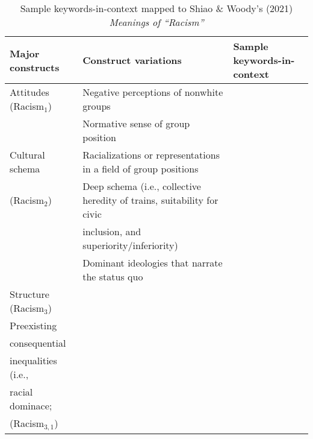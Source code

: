 \renewcommand{\arraystretch}{1.15}
\begin{landscape}
\begin{table}[h]
\centering
\caption{Sample keywords-in-context mapped to Shiao \& Woody's (2021) \textit{Meanings of ``Racism''}}
\label{tab:my-table}
\begin{tabular}{lll}
\toprule
Major constructs         & Construct variations & Sample keywords-in-context                     \\
\midrule
Attitudes (Racism$_{1}$) & Negative perceptions of nonwhite groups &  \\
                   &                      Normative sense of group position   &    \\
Cultural schema   &    Racializations or representations in a field of group positions                     &                                         \\
     \hspace{0.5cm}    (Racism$_{2}$)          &    Deep schema (i.e., collective heredity of trains, suitability for civic & \\   
                   & \hspace{0.5cm} inclusion, and superiority/inferiority)                   &      \\                               
                   &        Dominant ideologies that narrate the status quo                  &                                         \\
 Structure (Racism$_{3}$)                  &                          &                                         \\
  \hspace{.5cm} Preexisting                 &                      &                                         \\
    \hspace{.5cm} consequential                 &                          &                                         \\
     \hspace{.5cm} inequalities (i.e.,             &                          &                                         \\
    \hspace{.5cm} racial dominace;                 &                          &                                         \\
     \hspace{.5cm} (Racism$_{3,1}$)                   &                          &                                         \\

\end{tabular}
\end{table}
\end{landscape}
